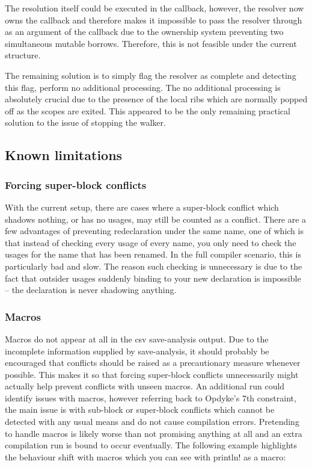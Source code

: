 The resolution itself could be executed in the callback, however, the resolver now owns the callback and therefore makes it impossible to pass the resolver through as an argument of the callback due to the ownership system preventing two simultaneous mutable borrows. Therefore, this is not feasible under the current structure.

The remaining solution is to simply flag the resolver as complete and detecting this flag, perform no additional processing. The no additional processing is absolutely crucial due to the presence of the local ribs which are normally popped off as the scopes are exited. This appeared to be the only remaining practical solution to the issue of stopping the walker.

\subsection{Known limitations}\label{S:limit}
\subsubsection{Forcing super-block conflicts}
With the current setup, there are cases where a super-block conflict which shadows nothing, or has no usages, may still be counted as a conflict. There are a few advantages of preventing redeclaration under the same name, one of which is that instead of checking every usage of every name, you only need to check the usages for the name that has been renamed. In the full compiler scenario, this is particularly bad and slow. The reason such checking is unnecessary is due to the fact that outsider usages suddenly binding to your new declaration is impossible -- the declaration is never shadowing anything.

\subsubsection{Macros}
Macros do not appear at all in the csv save-analysis output. Due to the incomplete information supplied by save-analysis, it should probably be encouraged that conflicts should be raised as a precautionary measure whenever possible. This makes it so that forcing super-block conflicts unnecessarily might actually help prevent conflicts with unseen macros. An additional run could identify issues with macros, however referring back to Opdyke's 7th constraint, the main issue is with sub-block or super-block conflicts which cannot be detected with any usual means and do not cause compilation errors. Pretending to handle macros is likely worse than not promising anything at all and an extra compilation run is bound to occur eventually. The following example highlights the behaviour shift with macros which you can see with println! as a macro:


